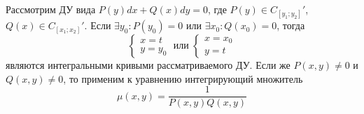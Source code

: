    Рассмотрим ДУ вида $P(y)dx + Q(x)dy = 0$, где $P(y) \in C_{[y_1; y_2]}'$, $Q(x) \in C_{[x_1; x_2]}'$. Если $\exists y_0: P(y_0) = 0$ или  $\exists x_0: Q(x_0) = 0$, тогда
    \begin{equation}
        \begin{cases}
            x = t \\ 
            y = y_0
        \end{cases} \;
        \text{или} \;
        \begin{cases}
            x = x_0 \\ 
            y = t
        \end{cases}
    \end{equation}
    являются интегральными кривыми рассматриваемого ДУ. Если же $P(x, y) \neq 0$ и $Q(x, y) \neq 0$, то применим к уравнению интегрирующий множитель \[\mu(x, y) = \frac{1}{P(x, y)Q(x, y)}\]
    
